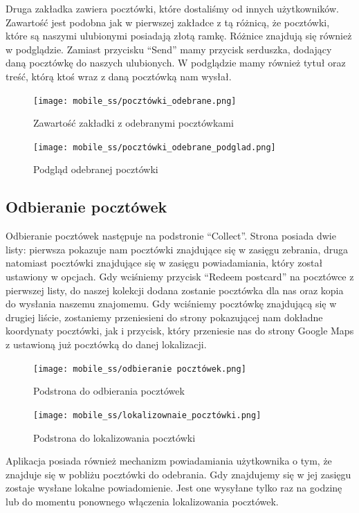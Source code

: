 \documentclass[a4paper,twoside,12pt]{book}
\begin{document}
Druga zakładka zawiera pocztówki, które dostaliśmy od innych użytkowników. Zawartość jest podobna jak w pierwszej zakładce z tą różnicą, że pocztówki, które są naszymi ulubionymi posiadają złotą ramkę. Różnice znajdują się również w podglądzie. Zamiast przycisku ``Send'' mamy przycisk serduszka, dodający daną pocztówkę do naszych ulubionych.  W podglądzie mamy również tytuł oraz treść, którą ktoś wraz z daną pocztówką nam wysłał.
\newpage
\begin{figure}[H]
  \centering
  \begin{minipage}[b]{0.49\textwidth}
    \texttt{[image: mobile\_ss/pocztówki\_odebrane.png]}
    \caption{Zawartość zakładki z odebranymi pocztówkami}
  \end{minipage}
  \hfill
  \begin{minipage}[b]{0.49\textwidth}
    \texttt{[image: mobile\_ss/pocztówki\_odebrane\_podglad.png]}
    \caption{Podgląd odebranej pocztówki\\}
  \end{minipage}
\end{figure}

\subsection{Odbieranie pocztówek}

Odbieranie pocztówek następuje na podstronie ``Collect''. Strona posiada dwie listy: pierwsza pokazuje nam pocztówki znajdujące się w zasięgu zebrania, druga natomiast pocztówki znajdujące się w zasięgu powiadamiania, który został ustawiony w opcjach. Gdy wciśniemy przycisk ``Redeem postcard'' na pocztówce z pierwszej listy, do naszej kolekcji dodana zostanie pocztówka dla nas oraz kopia do wysłania naszemu znajomemu. Gdy wciśniemy pocztówkę znajdującą się w drugiej liście, zostaniemy przeniesieni do strony pokazującej nam dokładne koordynaty pocztówki, jak i przycisk, który przeniesie nas do strony Google Maps z ustawioną już pocztówką do danej lokalizacji.

\begin{figure}[H]
  \centering
  \begin{minipage}[b]{0.49\textwidth}
    \texttt{[image: mobile\_ss/odbieranie pocztówek.png]}
    \caption{Podstrona do odbierania pocztówek}
  \end{minipage}
  \hfill
  \begin{minipage}[b]{0.49\textwidth}
    \texttt{[image: mobile\_ss/lokalizownaie\_pocztówki.png]}
    \caption{Podstrona do lokalizowania pocztówki}
  \end{minipage}
\end{figure}
\newpage
Aplikacja posiada również mechanizm powiadamiania użytkownika o tym, że znajduje się w pobliżu pocztówki do odebrania. Gdy znajdujemy się w jej zasięgu zostaje wysłane lokalne powiadomienie. Jest one wysyłane tylko raz na godzinę lub do momentu ponownego włączenia lokalizowania pocztówek.
\end{document}
